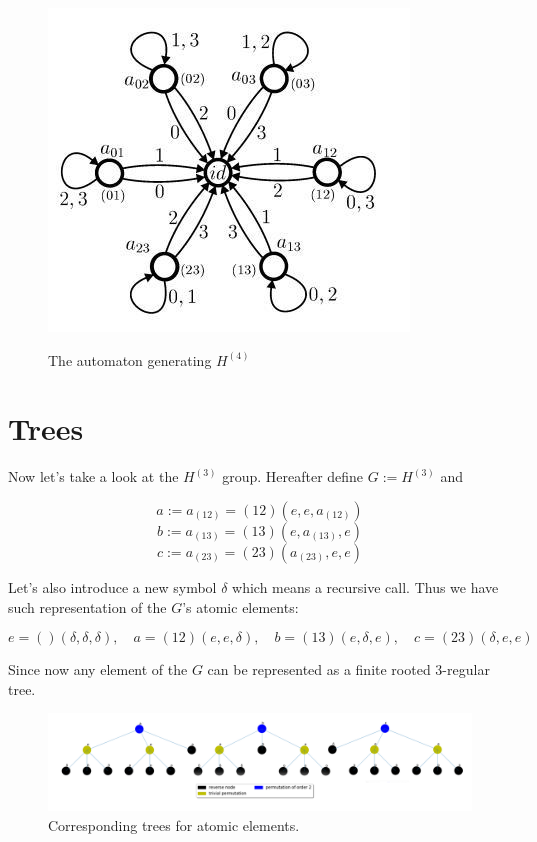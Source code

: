 \documentclass{article}
\begin{document}
\begin{figure}[h]
	\centering
	\includegraphics[scale=0.5]{../graphs/automaton_h4.jpg}
	\label{automaton}
	\caption{The automaton generating $H^{(4)}$}	

\end{figure}


\section{Trees}

Now let's take a look at the $H^{(3)}$ group. Hereafter define $G := H^{(3)}$ and 

$$ a := a_{(12)} = (1 2) (e, e, a_{(12)}) $$
$$ b := a_{(13)} = (1 3) (e, a_{(13)}, e) $$
$$ c := a_{(23)} = (2 3) (a_{(23)}, e, e) $$

Let's also introduce a new symbol $\delta$ which means a recursive call. Thus we
have such representation of the $G$'s atomic elements:

$$ e = () (\delta, \delta, \delta), \quad a = (1 2) (e, e, \delta), \quad 
b = (1 3)(e, \delta, e), \quad c = (2 3)(\delta, e, e)$$

Since now any element of the $G$ can be represented as a finite rooted 3-regular 
tree. 

\begin{figure}[h]
	\centering
	\includegraphics[scale=0.13]{../graphs/a_b_c.png}
	\caption{Corresponding trees for atomic elements.}
	\label{a_b_c}	
\end{figure}
\end{document}
